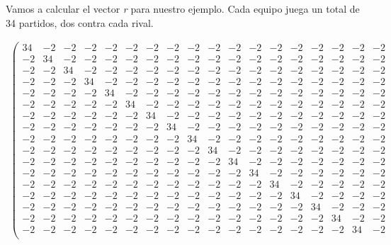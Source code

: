 \begin{ejem} Vamos a calcular el vector \textit{r} para nuestro ejemplo. Cada equipo juega un total de 34 partidos, dos contra cada rival.\\
\end{ejem}
{\tiny \[
\begin{array}{ccccccccccccccccccccc} 
\left(\begin{array}{cccccccccccccccccc}
34 & -2 & -2 & -2 & -2 & -2 & -2 & -2 & -2 & -2 & -2 & -2 & -2 & -2 & -2 & -2 & -2 & -2\\
-2 & 34 & -2 & -2 & -2 & -2 & -2 & -2 & -2 & -2 & -2 & -2 & -2 & -2 & -2 & -2 & -2 & -2\\
-2 & -2 & 34 & -2 & -2 & -2 & -2 & -2 & -2 & -2 & -2 & -2 & -2 & -2 & -2 & -2 & -2 & -2\\
-2 & -2 & -2 & 34 & -2 & -2 & -2 & -2 & -2 & -2 & -2 & -2 & -2 & -2 & -2 & -2 & -2 & -2\\
-2 & -2 & -2 & -2 & 34 & -2 & -2 & -2 & -2 & -2 & -2 & -2 & -2 & -2 & -2 & -2 & -2 & -2\\
-2 & -2 & -2 & -2 & -2 & 34 & -2 & -2 & -2 & -2 & -2 & -2 & -2 & -2 & -2 & -2 & -2 & -2\\
-2 & -2 & -2 & -2 & -2 & -2 & 34 & -2 & -2 & -2 & -2 & -2 & -2 & -2 & -2 & -2 & -2 & -2\\
-2 & -2 & -2 & -2 & -2 & -2 & -2 & 34 & -2 & -2 & -2 & -2 & -2 & -2 & -2 & -2 & -2 & -2\\
-2 & -2 & -2 & -2 & -2 & -2 & -2 & -2 & 34 & -2 & -2 & -2 & -2 & -2 & -2 & -2 & -2 & -2\\
-2 & -2 & -2 & -2 & -2 & -2 & -2 & -2 & -2 & 34 & -2 & -2 & -2 & -2 & -2 & -2 & -2 & -2\\
-2 & -2 & -2 & -2 & -2 & -2 & -2 & -2 & -2 & -2 & 34 & -2 & -2 & -2 & -2 & -2 & -2 & -2\\
-2 & -2 & -2 & -2 & -2 & -2 & -2 & -2 & -2 & -2 & -2 & 34 & -2 & -2 & -2 & -2 & -2 & -2\\
-2 & -2 & -2 & -2 & -2 & -2 & -2 & -2 & -2 & -2 & -2 & -2 & 34 & -2 & -2 & -2 & -2 & -2\\
-2 & -2 & -2 & -2 & -2 & -2 & -2 & -2 & -2 & -2 & -2 & -2 & -2 & 34 & -2 & -2 & -2 & -2\\
-2 & -2 & -2 & -2 & -2 & -2 & -2 & -2 & -2 & -2 & -2 & -2 & -2 & -2 & 34 & -2 & -2 & -2\\
-2 & -2 & -2 & -2 & -2 & -2 & -2 & -2 & -2 & -2 & -2 & -2 & -2 & -2 & -2 & 34 & -2 & -2\\ 
-2 & -2 & -2 & -2 & -2 & -2 & -2 & -2 & -2 & -2 & -2 & -2 & -2 & -2 & -2 & -2 & 34 & -2\\

\end{array}
\end{array}\]}
